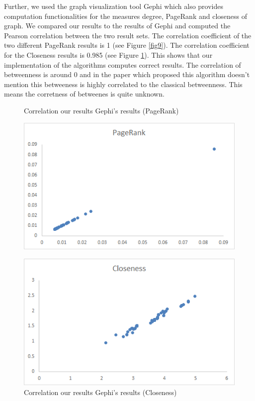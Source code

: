 Further, we used the graph visualization tool Gephi which also provides computation functionalities for the measures degree, PageRank and closeness of graph. We compared our results to the results of Gephi and computed the Pearson correlation between the two result sets. The correlation coefficient of the two different PageRank results is 1 (see Figure \ref{fig9}). The correlation coefficient for the Closeness results is 0.985 (see Figure \ref{fig10}). This shows that our implementation of the algorithms computes correct results. The correlation of betweenness is around 0 and in the paper which proposed this algorithm doesn't mention this betweeness is highly correlated to the classical betweenness. This means the corretness of betweenes is quite unknown.

\begin{figure}[H]
\begin{minipage}{.5\textwidth}
	\begin{center}
		\caption{Correlation our results Gephi’s results (PageRank)}		
		\label{fig9}		
		\includegraphics[width=1.0\textwidth]{fig9}	
	\end{center}
\end{minipage} %
\begin{minipage}{.5\textwidth}
	\begin{center}
		\caption{Correlation our results Gephi’s results (Closeness)}		
		\label{fig10}		
		\includegraphics[width=1.0\textwidth]{fig10}	
	\end{center}
\end{minipage}
\end{figure}

